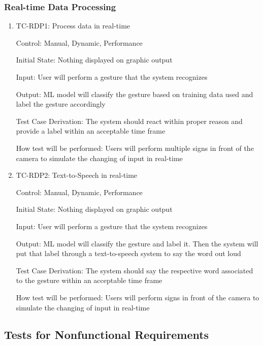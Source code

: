 \documentclass[12pt]{article}
\begin{document}
\subsubsection{Real-time Data Processing}
  
\begin{enumerate}
  
\item{TC-RDP1: Process data in real-time\\}
  
Control: Manual, Dynamic, Performance
                
Initial State: Nothing displayed on graphic output
                
Input: User will perform a gesture that the system recognizes
                
Output: ML model will classify the gesture based on training data used and label the gesture accordingly
      
Test Case Derivation: The system should react within proper reason and provide a label within an acceptable time frame
      
How test will be performed: Users will perform multiple signs in front of the camera to simulate the changing of input in real-time
  
\item{TC-RDP2: Text-to-Speech in real-time\\}
  
Control: Manual, Dynamic, Performance
                
Initial State: Nothing displayed on graphic output
                
Input: User will perform a gesture that the system recognizes
                
Output: ML model will classify the gesture and label it. Then the system will put that label through a text-to-speech system to say the word out loud
      
Test Case Derivation: The system should say the respective word associated to the gesture within an acceptable time frame
      
How test will be performed: Users will perform signs in front of the camera to simulate the changing of input in real-time
  
\end{enumerate}

\subsection{Tests for Nonfunctional Requirements}
\end{document}
